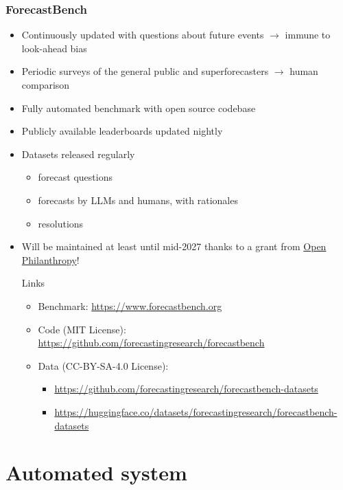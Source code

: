 \documentclass[aspectratio=169]{beamer}
\begin{document}
\begin{frame}
  \frametitle{ForecastBench}
  \begin{itemize}
  \item Continuously updated with questions about future events $\rightarrow$ immune to look-ahead bias
  \item Periodic surveys of the general public and superforecasters $\rightarrow$ human comparison
  \item Fully automated benchmark with open source codebase
  \item Publicly available leaderboards updated nightly
  \item Datasets released regularly
    \begin{itemize}
    \item forecast questions
    \item forecasts by LLMs and humans, with rationales
    \item resolutions
    \end{itemize}
  \item Will be maintained at least until mid-2027 thanks to a grant from \href{https://www.openphilanthropy.org/}{Open Philanthropy}!
    \begin{block}{Links}
      \begin{itemize}
      \item Benchmark: \href{https://www.forecastbench.org/}{https://www.forecastbench.org}
      \item Code (MIT License): \href{https://github.com/forecastingresearch/forecastbench}{https://github.com/forecastingresearch/forecastbench}
      \item Data (CC-BY-SA-4.0 License):
        \begin{itemize}
        \item \href{https://github.com/forecastingresearch/forecastbench-datasets}{https://github.com/forecastingresearch/forecastbench-datasets}
        \item \href{https://huggingface.co/datasets/forecastingresearch/forecastbench-datasets}{https://huggingface.co/datasets/forecastingresearch/forecastbench-datasets}
        \end{itemize}
      \end{itemize}
    \end{block}
  \end{itemize}
\end{frame}


\section{Automated system}
\end{document}
